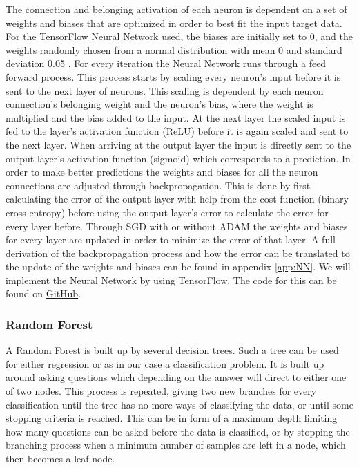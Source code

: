 \documentclass[11pt]{article}
\begin{document}
The connection and belonging activation of each neuron is dependent on a set of weights and biases that are optimized in order to best fit the input target data. For the TensorFlow Neural Network used, the biases are initially set to 0, and the weights randomly chosen from a normal distribution with mean 0 and standard deviation 0.05 \cite{tf}. For every iteration the Neural Network runs through a feed forward process. This process starts by scaling every neuron's input before it is sent to the next layer of neurons. This scaling is dependent by each neuron connection's belonging weight and the neuron's bias, where the weight is multiplied and the bias added to the input. At the next layer the scaled input is fed to the layer's activation function (ReLU) before it is again scaled and sent to the next layer. When arriving at the output layer the input is directly sent to the output layer's activation function (sigmoid) which corresponds to a prediction. In order to make better predictions the weights and biases for all the neuron connections are adjusted through backpropagation. This is done by first calculating the error of the output layer with help from the cost function (binary cross entropy) before using the output layer's error to calculate the error for every layer before.  Through SGD with or without ADAM the weights and biases for every layer are updated in order to minimize the error of that layer. A full derivation of the backpropagation process and how the error can be translated to the update of the weights and biases can be found in appendix \ref{app:NN}. We will implement the Neural Network by using TensorFlow. The code for this can be found on \href{https://github.com/Fslippe/FYS-STK4155/tree/main/project3}{GitHub}.


\subsubsection*{Random Forest}
A Random Forest is built up by several decision trees. Such a tree can be used for either regression or as in our case a classification problem. It is built up around asking questions which depending on the answer will direct to either one of two nodes. This process is repeated, giving two new branches for every classification until the tree has no more ways of classifying the data, or until some stopping criteria is reached. This can be in form of a maximum depth limiting how many questions can be asked before the data is classified, or by stopping the branching process when a minimum number of samples are left in a node, which then becomes a leaf node.
\end{document}
